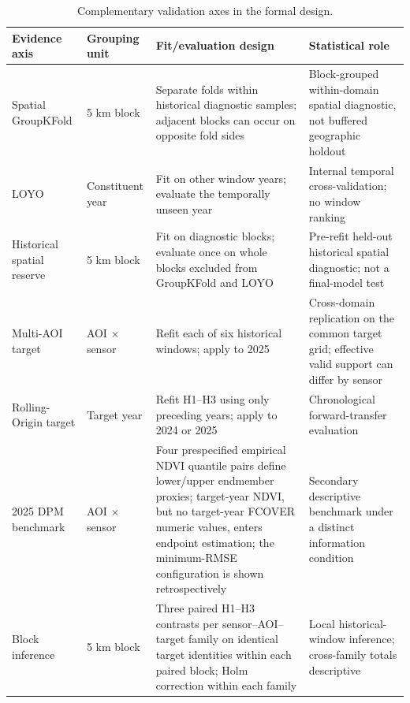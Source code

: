 \begin{table}[!t]\centering\scriptsize
\caption{Complementary validation axes in the formal design.}\label{tab:validation}
\begin{tabularx}{.98\textwidth}{L{3.10cm}L{2.45cm}Y Y}\toprule
Evidence axis & Grouping unit & Fit/evaluation design & Statistical role \\\midrule
Spatial GroupKFold & 5 km block & Separate folds within historical diagnostic samples; adjacent blocks can occur on opposite fold sides & Block-grouped within-domain spatial diagnostic, not buffered geographic holdout \\
LOYO & Constituent year & Fit on other window years; evaluate the temporally unseen year & Internal temporal cross-validation; no window ranking \\
Historical spatial reserve & 5 km block & Fit on diagnostic blocks; evaluate once on whole blocks excluded from GroupKFold and LOYO & Pre-refit held-out historical spatial diagnostic; not a final-model test \\
Multi-AOI target & AOI $\times$ sensor & Refit each of six historical windows; apply to 2025 & Cross-domain replication on the common target grid; effective valid support can differ by sensor \\
Rolling-Origin target & Target year & Refit H1--H3 using only preceding years; apply to 2024 or 2025 & Chronological forward-transfer evaluation \\
2025 DPM benchmark & AOI $\times$ sensor & Four prespecified empirical NDVI quantile pairs define lower/upper endmember proxies; target-year NDVI, but no target-year FCOVER numeric values, enters endpoint estimation; the minimum-RMSE configuration is shown retrospectively & Secondary descriptive benchmark under a distinct information condition \\
Block inference & 5 km block & Three paired H1--H3 contrasts per sensor--AOI--target family on identical target identities within each paired block; Holm correction within each family & Local historical-window inference; cross-family totals descriptive \\\bottomrule
\end{tabularx}
\end{table}
